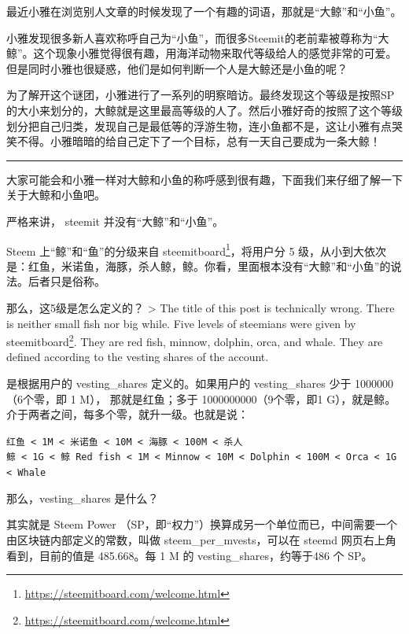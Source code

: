 \documentclass[]{ctexbook}
\renewcommand{\href}[2]{#2\footnote{\url{#1}}}
\begin{document}
最近小雅在浏览别人文章的时候发现了一个有趣的词语，那就是``大鲸''和``小鱼''。

小雅发现很多新人喜欢称呼自己为``小鱼''，而很多Steemit的老前辈被尊称为``大鲸''。这个现象小雅觉得很有趣，用海洋动物来取代等级给人的感觉非常的可爱。但是同时小雅也很疑惑，他们是如何判断一个人是大鲸还是小鱼的呢？

为了解开这个谜团，小雅进行了一系列的明察暗访。最终发现这个等级是按照SP的大小来划分的，大鲸就是这里最高等级的人了。然后小雅好奇的按照了这个等级划分把自己归类，发现自己是最低等的浮游生物，连小鱼都不是，这让小雅有点哭笑不得。小雅暗暗的给自己定下了一个目标，总有一天自己要成为一条大鲸！

\begin{center}\rule{0.5\linewidth}{\linethickness}\end{center}

大家可能会和小雅一样对大鲸和小鱼的称呼感到很有趣，下面我们来仔细了解一下关于大鲸和小鱼吧。

严格来讲， steemit 并没有``大鲸''和``小鱼''。

Steem 上``鲸''和``鱼''的分级来自 \href{https://steemitboard.com/welcome.html}{steemitboard}，将用户分 5 级，从小到大依次是：红鱼，米诺鱼，海豚，杀人鲸，鲸。你看，里面根本没有``大鲸''和``小鱼''的说法。后者只是俗称。

那么，这5级是怎么定义的？
\textgreater{} The title of this post is technically wrong. There is neither small fish nor big while. Five levels of steemians were given by \href{https://steemitboard.com/welcome.html}{steemitboard}. They are red fish, minnow, dolphin, orca, and whale. They are defined according to the vesting shares of the account.

是根据用户的 vesting\_shares 定义的。如果用户的 vesting\_shares 少于 1000000（6个零，即 1 M）， 那就是红鱼；多于 1000000000（9个零，即1 G），就是鲸。介于两者之间，每多个零，就升一级。也就是说：

\texttt{红鱼\ \textless{}\ 1M\ \textless{}\ 米诺鱼\ \textless{}\ 10M\ \textless{}\ 海豚\ \textless{}\ 100M\ \textless{}\ 杀人鲸\ \textless{}\ 1G\ \textless{}\ 鲸\ Red\ fish\ \textless{}\ 1M\ \textless{}\ Minnow\ \textless{}\ 10M\ \textless{}\ Dolphin\ \textless{}\ 100M\ \textless{}\ Orca\ \textless{}\ 1G\ \textless{}\ Whale}

那么，vesting\_shares 是什么？

其实就是 Steem Power （SP，即``权力''）换算成另一个单位而已，中间需要一个由区块链内部定义的常数，叫做 steem\_per\_mvests，可以在 steemd 网页右上角看到，目前的值是 485.668。每 1 M 的 vesting\_shares，约等于486 个 SP。
\end{document}
